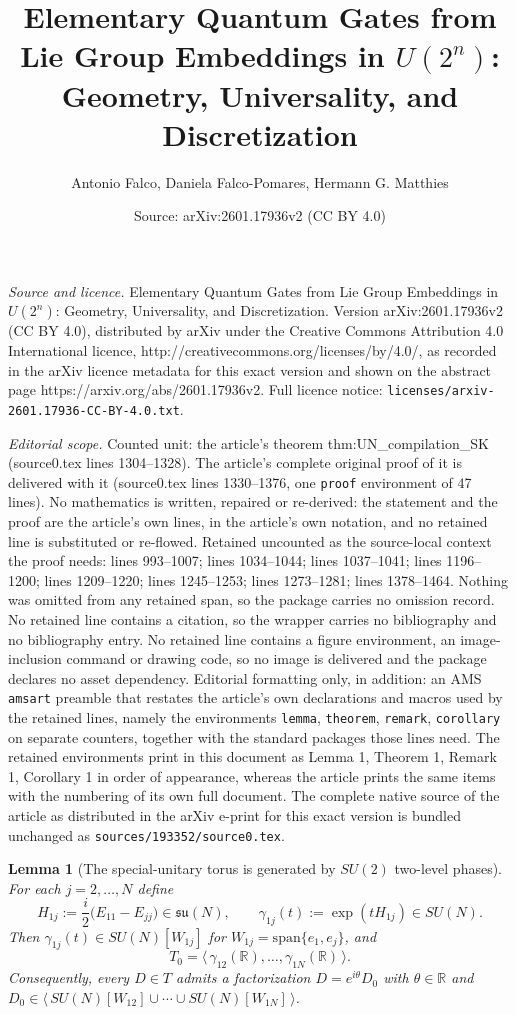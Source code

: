 \documentclass[10pt,a4paper]{amsart}
\title{Elementary Quantum Gates from Lie Group Embeddings in \texorpdfstring{$U(2^n)$}{U(2^n)}: Geometry, Universality, and Discretization}
\author{Antonio Falco, Daniela Falco-Pomares, Hermann G. Matthies}
\date{Source: arXiv:2601.17936v2 (CC BY 4.0)}
\newtheorem{lemma}{Lemma}
\newcommand{\R}{\mathbb{R}}
\begin{document}
\maketitle

\noindent\emph{Source and licence.} Elementary Quantum Gates from Lie Group Embeddings in \texorpdfstring{$U(2^n)$}{U(2^n)}: Geometry, Universality, and Discretization. Version arXiv:2601.17936v2 (CC BY 4.0), distributed by arXiv under the Creative Commons Attribution 4.0 International licence, http://creativecommons.org/licenses/by/4.0/, as recorded in the arXiv licence metadata for this exact version and shown on the abstract page https://arxiv.org/abs/2601.17936v2. Full licence notice: \texttt{licenses/arxiv-2601.17936-CC-BY-4.0.txt}.\par\smallskip

\noindent\textit{Editorial scope.} Counted unit: the article's theorem thm:UN\_compilation\_SK (source0.tex lines 1304--1328). The article's complete original proof of it is delivered with it (source0.tex lines 1330--1376, one \texttt{proof} environment of 47 lines). No mathematics is written, repaired or re-derived: the statement and the proof are the article's own lines, in the article's own notation, and no retained line is substituted or re-flowed.  Retained uncounted as the source-local context the proof needs: lines 993--1007; lines 1034--1044; lines 1037--1041; lines 1196--1200; lines 1209--1220; lines 1245--1253; lines 1273--1281; lines 1378--1464.  Nothing was omitted from any retained span, so the package carries no omission record.  No retained line contains a citation, so the wrapper carries no bibliography and no bibliography entry.  No retained line contains a figure environment, an image-inclusion command or drawing code, so no image is delivered and the package declares no asset dependency.  Editorial formatting only, in addition: an AMS \texttt{amsart} preamble that restates the article's own declarations and macros used by the retained lines, namely the environments \texttt{lemma}, \texttt{theorem}, \texttt{remark}, \texttt{corollary} on separate counters, together with the standard packages those lines need.  The retained environments print in this document as Lemma 1, Theorem 1, Remark 1, Corollary 1 in order of appearance, whereas the article prints the same items with the numbering of its own full document.  The complete native source of the article as distributed in the arXiv e-print for this exact version is bundled unchanged as \texttt{sources/193352/source0.tex}.
\begin{lemma}[The special-unitary torus is generated by $SU(2)$ two-level phases]
\label{lem:T0_generated_by_two_level_phases_concise}
For each $j=2,\dots,N$ define
\[
H_{1j}:=\frac{i}{2}\big(E_{11}-E_{jj}\big)\in\mathfrak{su}(N),
\qquad
\gamma_{1j}(t):=\exp(tH_{1j})\in SU(N).
\]
Then $\gamma_{1j}(t)\in SU(N)[W_{1j}]$ for $W_{1j}=\mathrm{span}\{e_1,e_j\}$, and
\[
T_0=\Big\langle\,\gamma_{12}(\R),\dots,\gamma_{1N}(\R)\,\Big\rangle.
\]
Consequently, every $D\in T$ admits a factorization $D=e^{i\theta}D_0$ with $\theta\in\R$ and
$D_0\in\big\langle\,SU(N)[W_{12}]\allowbreak\cup\cdots\allowbreak\cup SU(N)[W_{1N}]\,\big\rangle$.
\end{lemma}
\end{document}
